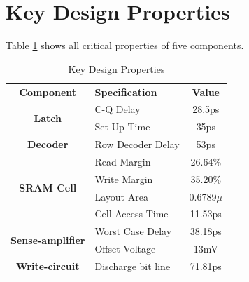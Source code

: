 \documentclass[conference]{IEEEtran}
\begin{document}
\section{Key Design Properties}
Table \ref{key_prop_tabl} shows all critical properties of five components.
\begin{table}[h]
\caption{Key Design Properties}
\begin{center}
\begin{tabular}{|c|l|c|}
\hline
\textbf{Component}&\textbf{Specification}&\textbf{Value} \\
\cline{1-3} 
\multirow{2}{*}{\textbf{Latch}} & C-Q Delay& 28.5ps \\
\cline{2-3} 
& Set-Up Time & 35ps \\
 
\cline{1-3} 
\multirow{1}{*}{\textbf{Decoder}} & Row Decoder Delay & 53ps \\

\cline{1-3} 
\multirow{4}{*}{\textbf{SRAM Cell}} & Read Margin & 26.64\% \\
\cline{2-3} 
& Write Margin & 35.20\% \\
\cline{2-3} 
& Layout Area &  0.6789$ \mu $ \\
\cline{2-3} 
& Cell Access Time& 11.53ps \\
\cline{2-3} 

\cline{1-3} 
\multirow{2}{*}{\textbf{Sense-amplifier}} & Worst Case Delay & 38.18ps \\
\cline{2-3} 
 & Offset Voltage& 13mV \\
 
\cline{1-3} 
\textbf{Write-circuit} & Discharge bit line &  71.81ps\\
\cline{1-3} 

\end{tabular}
\label{key_prop_tabl}
\end{center}
\end{table}
\end{document}
